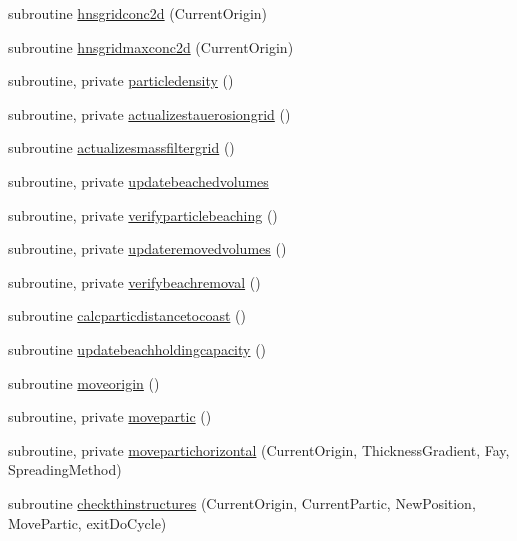 \begin{DoxyCompactItemize}
subroutine \mbox{\hyperlink{namespacemodulelagrangianglobal_aebb9bea8e1ba0060251e687c3050561e}{hnsgridconc2d}} (Current\+Origin)
\item 
subroutine \mbox{\hyperlink{namespacemodulelagrangianglobal_ae8087b21cc2eb799dc6cc0ca8fca855a}{hnsgridmaxconc2d}} (Current\+Origin)
\item 
subroutine, private \mbox{\hyperlink{namespacemodulelagrangianglobal_ab8679a80515beaf8591834517dac26d2}{particledensity}} ()
\item 
subroutine, private \mbox{\hyperlink{namespacemodulelagrangianglobal_a1ed2a4fd6026ab2cae60ca5e59d48c5c}{actualizestauerosiongrid}} ()
\item 
subroutine \mbox{\hyperlink{namespacemodulelagrangianglobal_a9f884711ce254712333517d3851888e9}{actualizesmassfiltergrid}} ()
\item 
subroutine, private \mbox{\hyperlink{namespacemodulelagrangianglobal_a64f9a95bbf347c4a3b9599b01ab16129}{updatebeachedvolumes}}
\item 
subroutine, private \mbox{\hyperlink{namespacemodulelagrangianglobal_a2d56e0e16cf1181052cd535803200b87}{verifyparticlebeaching}} ()
\item 
subroutine, private \mbox{\hyperlink{namespacemodulelagrangianglobal_a43b7c49b0fc50c80ec9c87139197e60b}{updateremovedvolumes}} ()
\item 
subroutine, private \mbox{\hyperlink{namespacemodulelagrangianglobal_aa5dd026eab84c8d529a778738099f2a9}{verifybeachremoval}} ()
\item 
subroutine \mbox{\hyperlink{namespacemodulelagrangianglobal_a93a1f184ec51e9c61c7ac05ecf8d9364}{calcparticdistancetocoast}} ()
\item 
subroutine \mbox{\hyperlink{namespacemodulelagrangianglobal_a339c78433f179a296304ed03a3fcfae9}{updatebeachholdingcapacity}} ()
\item 
subroutine \mbox{\hyperlink{namespacemodulelagrangianglobal_a214f6221918e0904f9300fa3b9a00cb3}{moveorigin}} ()
\item 
subroutine, private \mbox{\hyperlink{namespacemodulelagrangianglobal_a82279a8ab7ce219fe5a1bfff091e611f}{movepartic}} ()
\item 
subroutine, private \mbox{\hyperlink{namespacemodulelagrangianglobal_ab81fef0d1f9d7e83be8f27e7313bf968}{movepartichorizontal}} (Current\+Origin, Thickness\+Gradient, Fay, Spreading\+Method)
\item 
subroutine \mbox{\hyperlink{namespacemodulelagrangianglobal_a48ae2541ace36a54cdc28eebb4617d29}{checkthinstructures}} (Current\+Origin, Current\+Partic, New\+Position, Move\+Partic, exit\+Do\+Cycle)

\end{DoxyCompactItemize}
